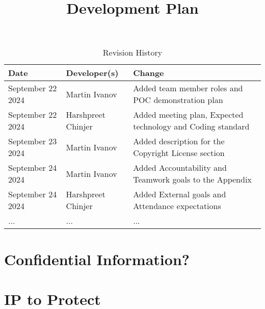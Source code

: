\documentclass{article}
\title{Development Plan\\\progname}
\author{\authname}
\date{}
\begin{document}
\maketitle

\begin{table}[hp]
\caption{Revision History} \label{TblRevisionHistory}
\begin{tabularx}{\textwidth}{llX}
\toprule
\textbf{Date} & \textbf{Developer(s)} & \textbf{Change}\\
\midrule
September 22 2024 & Martin Ivanov & Added team member roles and POC demonstration plan\\
September 22 2024 & Harshpreet Chinjer & Added meeting plan, Expected technology and Coding standard\\
September 23 2024 & Martin Ivanov & Added description for the Copyright License section\\
September 24 2024 & Martin Ivanov & Added Accountability and Teamwork goals to the Appendix\\
September 24 2024 & Harshpreet Chinjer & Added External goals and Attendance expectations\\
... & ... & ...\\
\bottomrule
\end{tabularx}
\end{table}

\newpage{}



\section{Confidential Information?}


\section{IP to Protect}
\end{document}

